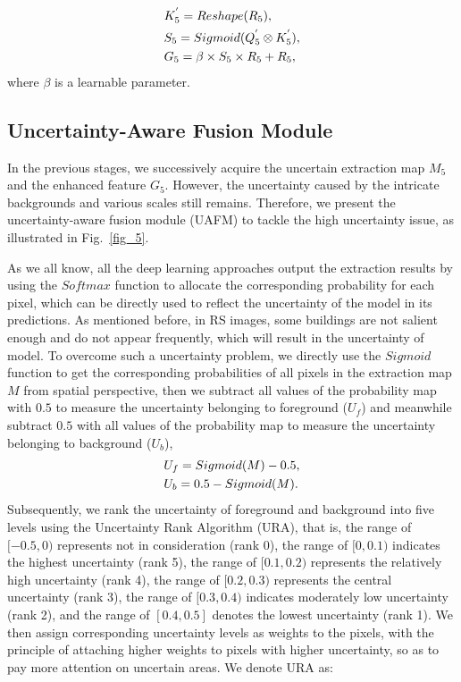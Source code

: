 \documentclass[lettersize,journal]{IEEEtran}
\begin{document}
\begin{equation}
\centering
\label{pigm_FINAL} 
\begin{split}
    &K_{5}^{'} = Reshape(R_{5}), \\
    &S_{5} = Sigmoid(Q_{5}^{'}\otimes K_{5}^{'}), \\
    &G_{5} = \beta \times S_{5} \times R_{5} + R_{5}, 
\end{split}
\end{equation}
where $\beta$ is a learnable parameter.

\subsection{Uncertainty-Aware Fusion Module}
\label{sec:UAFM}
In the previous stages, we successively acquire the uncertain extraction map $M_{5}$ and the enhanced feature $G_{5}$. However, the uncertainty caused by the intricate backgrounds and various scales still remains. Therefore, we present the uncertainty-aware fusion module (UAFM) to tackle the high uncertainty issue, as illustrated in Fig.~\ref{fig_5}.
\par
As we all know, all the deep learning approaches output the extraction results by using the $Softmax$ function to allocate the corresponding probability for each pixel, which can be directly used to reflect the uncertainty of the model in its predictions. As mentioned before, in RS images, some buildings are not salient enough and do not appear frequently, which will result in the uncertainty of model. To overcome such a uncertainty problem, we directly use the $Sigmoid$ function to get the corresponding probabilities of all pixels in the extraction map $M$ from spatial perspective, then we subtract all values of the probability map with $0.5$ to measure the uncertainty belonging to foreground ($U_{f}$) and meanwhile subtract $0.5$ with all values of the probability map to measure the uncertainty belonging to background ($U_{b}$),
\begin{equation}
\centering
\label{equ_u} 
\begin{split}
    &U_{f} = Sigmoid(M)-0.5, \\
    &U_{b} = 0.5 - Sigmoid(M).
\end{split}
\end{equation}
Subsequently, we rank the uncertainty of foreground and background into five levels using the Uncertainty Rank Algorithm (URA), that is, the range of $[-0.5,0)$ represents not in consideration (rank 0), the range of $[0, 0.1)$ indicates the highest uncertainty (rank 5), the range of $[0.1, 0.2)$ represents the relatively high uncertainty (rank 4), the range of $[0.2, 0.3)$ represents the central uncertainty (rank 3), the range of $[0.3, 0.4)$ indicates moderately low uncertainty (rank 2), and the range of $[0.4, 0.5]$ denotes the lowest uncertainty (rank 1). We then assign corresponding uncertainty levels as weights to the pixels, with the principle of attaching higher weights to pixels with higher uncertainty, so as to pay more attention on uncertain areas. We denote URA as:
\end{document}
